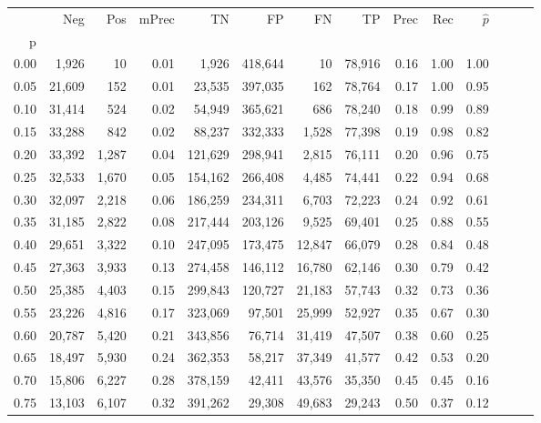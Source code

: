 \begin{tabular}{rrrrrrrrrrrrrr}
\toprule
{} &     Neg &    Pos & mPrec &       TN &       FP &      FN &      TP &  Prec &   Rec & $\hat{p}$ \\
p    &         &        &       &          &          &         &         &       &       &           \\
\midrule
0.00 &   1,926 &     10 &  0.01 &    1,926 &  418,644 &      10 &  78,916 &  0.16 &  1.00 &      1.00 \\
0.05 &  21,609 &    152 &  0.01 &   23,535 &  397,035 &     162 &  78,764 &  0.17 &  1.00 &      0.95 \\
0.10 &  31,414 &    524 &  0.02 &   54,949 &  365,621 &     686 &  78,240 &  0.18 &  0.99 &      0.89 \\
0.15 &  33,288 &    842 &  0.02 &   88,237 &  332,333 &   1,528 &  77,398 &  0.19 &  0.98 &      0.82 \\
0.20 &  33,392 &  1,287 &  0.04 &  121,629 &  298,941 &   2,815 &  76,111 &  0.20 &  0.96 &      0.75 \\
0.25 &  32,533 &  1,670 &  0.05 &  154,162 &  266,408 &   4,485 &  74,441 &  0.22 &  0.94 &      0.68 \\
0.30 &  32,097 &  2,218 &  0.06 &  186,259 &  234,311 &   6,703 &  72,223 &  0.24 &  0.92 &      0.61 \\
0.35 &  31,185 &  2,822 &  0.08 &  217,444 &  203,126 &   9,525 &  69,401 &  0.25 &  0.88 &      0.55 \\
0.40 &  29,651 &  3,322 &  0.10 &  247,095 &  173,475 &  12,847 &  66,079 &  0.28 &  0.84 &      0.48 \\
0.45 &  27,363 &  3,933 &  0.13 &  274,458 &  146,112 &  16,780 &  62,146 &  0.30 &  0.79 &      0.42 \\
0.50 &  25,385 &  4,403 &  0.15 &  299,843 &  120,727 &  21,183 &  57,743 &  0.32 &  0.73 &      0.36 \\
0.55 &  23,226 &  4,816 &  0.17 &  323,069 &   97,501 &  25,999 &  52,927 &  0.35 &  0.67 &      0.30 \\
0.60 &  20,787 &  5,420 &  0.21 &  343,856 &   76,714 &  31,419 &  47,507 &  0.38 &  0.60 &      0.25 \\
0.65 &  18,497 &  5,930 &  0.24 &  362,353 &   58,217 &  37,349 &  41,577 &  0.42 &  0.53 &      0.20 \\
0.70 &  15,806 &  6,227 &  0.28 &  378,159 &   42,411 &  43,576 &  35,350 &  0.45 &  0.45 &      0.16 \\
0.75 &  13,103 &  6,107 &  0.32 &  391,262 &   29,308 &  49,683 &  29,243 &  0.50 &  0.37 &      0.12 \\

\end{tabular}
